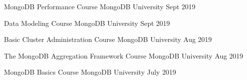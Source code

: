 \begin{cvhonors}

  \cvhonor
    {MongoDB Performance} %
    {Course} %
    {MongoDB University} %
    {Sept 2019} %

  \cvhonor
    {Data Modeling} %
    {Course} %
    {MongoDB University} %
    {Sept 2019} %

  \cvhonor
    {Basic Cluster Administration} %
    {Course} %
    {MongoDB University} %
    {Aug 2019} %

  \cvhonor
    {The MongoDB Aggregation Framework} %
    {Course} %
    {MongoDB University} %
    {Aug 2019} %

  \cvhonor
    {MongoDB Basics} %
    {Course} %
    {MongoDB University} %
    {July 2019} %

\end{cvhonors}
